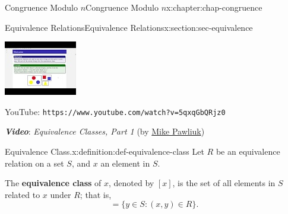 \documentclass[oneside,10pt,]{book}
\newcommand{\mono}[1]{\texttt{#1}}
\newcommand{\alert}[1]{\textbf{\textit{#1}}}
\newcommand{\terminology}[1]{\textbf{#1}}
\numberwithin{equation}{section}
\newlength{\qrsize}
\newlength{\previewwidth}
\begin{document}
\begin{chapterptx}{Congruence Modulo \(n\)}{}{Congruence Modulo \(n\)}{}{}{x:chapter:chap-congruence}
\begin{sectionptx}{Equivalence Relations}{}{Equivalence Relations}{}{}{x:section:sec-equivalence}
\begin{sidebyside}{1}{0}{0}{0}
\begin{sbspanel}{1}
\setlength{\previewwidth}{\linewidth}
\addtolength{\previewwidth}{-\qrsize}
\begin{tcbraster}[raster columns=2, raster column skip=1pt, raster halign=center, raster force size=false, raster left skip=0pt, raster right skip=0pt]%
\begin{tcolorbox}[previewstyle, width=\previewwidth]%
\includegraphics[width=0.80\linewidth,height=\qrsize,keepaspectratio]{images/video-equivalence-class-1.jpg}%
\end{tcolorbox}%
\begin{tcolorbox}[qrstyle]%
{\hypersetup{urlcolor=black}}%
\end{tcolorbox}%
\begin{tcolorbox}[captionstyle]%
\small YouTube: \mono{https://www.youtube.com/watch?v=5qxqGbQRjz0}\end{tcolorbox}%
\end{tcbraster}%
\end{sbspanel}%
\end{sidebyside}%
\par
\alert{Video}: \emph{Equivalence Classes, Part 1} (by \href{https://www.youtube.com/channel/UCnzqLoGhxAA46i9xcPHZavQ}{Mike Pawliuk})%
\begin{definition}{Equivalence Class.}{x:definition:def-equivalence-class}%
\label{g:notation:id536984}%
Let \(R\) be an equivalence relation on a set \(S\), and \(x\) an element in \(S\).%
\par
The \terminology{equivalence class} of \(x\), denoted by \([x]\), is the set of all elements in \(S\) related to \(x\) under \(R\); that is,%
\begin{equation*}
[x] = \{y \in S : (x,y) \in R\}\text{.}
\end{equation*}

\end{definition}
\end{sectionptx}
\end{chapterptx}
\end{document}
